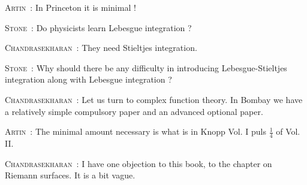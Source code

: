 \smallskip
\noindent
\textsc{Artin}~: In Princeton it is minimal !

\smallskip
\noindent
\textsc{Stone}~: Do physicists learn Lebesgue integration ?

\smallskip
\noindent
\textsc{Chandrasekharan}~: They need Stieltjes integration.

\smallskip
\noindent
\textsc{Stone}~: Why should there be any difficulty in introducing Lebesgue-Stieltjes integration along with Lebesgue integration ?

\smallskip
\noindent
\textsc{Chandrasekharan}~: Let us turn to complex function theory. In Bombay we have a relatively simple compulsory paper and an advanced optional paper.

\smallskip
\noindent
\textsc{Artin}~: The minimal amount necessary is what is in Knopp Vol. I puls $\frac{1}{4}$ of Vol. II.

\smallskip
\noindent
\textsc{Chandrasekharan}~: I have one objection to this book, to the chapter on Riemann surfaces. It is a bit vague.



